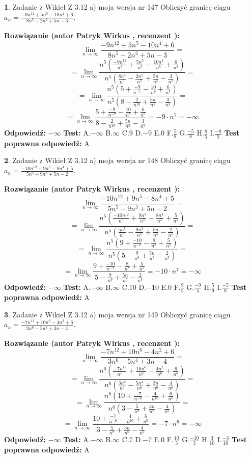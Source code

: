 \documentclass[12pt, a4paper]{article}
\theoremstyle{definition} %
\newtheorem{zad}{}
\newcommand{\zadStart}[1]{\begin{zad}#1\newline}
\newcommand{\zadStop}{\end{zad}}
\newcommand{\rozwStart}[2]{\noindent \textbf{Rozwiązanie (autor #1 , recenzent #2): }\newline}
\newcommand{\rozwStop}{\newline}
\newcommand{\odpStart}{\noindent \textbf{Odpowiedź:}\newline}
\newcommand{\odpStop}{\newline}
\newcommand{\testStart}{\noindent \textbf{Test:}\newline}
\newcommand{\testStop}{\newline}
\newcommand{\kluczStart}{\noindent \textbf{Test poprawna odpowiedź:}\newline}
\newcommand{\kluczStop}{\newline}
\begin{document}
\zadStart{Zadanie z Wikieł Z 3.12 a) moja wersja nr 147}
Obliczyć granicę ciągu $a_{n}=\frac{-9n^{12}+5n^{5}-10n^{4}+6}{8n^{5}-2n^{2}+5n-3}$.
\zadStop
\rozwStart{Patryk Wirkus}{}
$$\lim\limits_{n\to\infty}\frac{-9n^{12}+5n^{5}-10n^{4}+6}{8n^{5}-2n^{2}+5n-3}=$$
$$=\lim\limits_{n\to\infty}\frac{n^{5}\left(\frac{-9n^{12}}{n^{5}}+\frac{5n^{5}}{n^{5}}-\frac{10n^{4}}{n^{5}}+\frac{6}{n^{5}}\right)}{n^{5}\left(\frac{8n^{5}}{n^{5}}-\frac{2n^{2}}{n^{5}}+\frac{5n}{n^{5}}-\frac{3}{n^{5}}\right)}=$$
$$=\lim\limits_{n\to\infty}\frac{n^{5}\left(5+\frac{-9}{n^{-7}}-\frac{10}{n^{8}}+\frac{6}{n^{5}}\right)}
{n^{5}\left(8-\frac{2}{n^{10}}+\frac{5n}{n^{5}}-\frac{3}{n^{5}}\right)}=$$
$$=\lim\limits_{n\to\infty}\frac{5+\frac{-9}{n^{-7}}-\frac{10}{n^{8}}+\frac{6}{n^{5}}}{8-\frac{2}{n^{10}}+\frac{5n}{n^{5}}-\frac{3}{n^{5}}}=-9\cdot n^{7} = -\infty$$
\rozwStop
\odpStart
$-\infty$
\odpStop
\testStart
A.$-\infty$
B.$\infty$
C.$9$
D.$-9$
E.$0$
F.$\frac{5}{8}$
G.$\frac{-5}{8}$
H.$\frac{8}{5}$
I.$\frac{-8}{5}$
\testStop
\kluczStart
A
\kluczStop



\zadStart{Zadanie z Wikieł Z 3.12 a) moja wersja nr 148}
Obliczyć granicę ciągu $a_{n}=\frac{-10n^{12}+9n^{5}-8n^{4}+5}{5n^{5}-9n^{3}+5n-2}$.
\zadStop
\rozwStart{Patryk Wirkus}{}
$$\lim\limits_{n\to\infty}\frac{-10n^{12}+9n^{5}-8n^{4}+5}{5n^{5}-9n^{3}+5n-2}=$$
$$=\lim\limits_{n\to\infty}\frac{n^{5}\left(\frac{-10n^{12}}{n^{5}}+\frac{9n^{5}}{n^{5}}-\frac{8n^{4}}{n^{5}}+\frac{5}{n^{5}}\right)}{n^{5}\left(\frac{5n^{5}}{n^{5}}-\frac{9n^{3}}{n^{5}}+\frac{5n}{n^{5}}-\frac{2}{n^{5}}\right)}=$$
$$=\lim\limits_{n\to\infty}\frac{n^{5}\left(9+\frac{-10}{n^{-7}}-\frac{8}{n^{8}}+\frac{5}{n^{5}}\right)}
{n^{5}\left(5-\frac{9}{n^{9}}+\frac{5n}{n^{5}}-\frac{2}{n^{5}}\right)}=$$
$$=\lim\limits_{n\to\infty}\frac{9+\frac{-10}{n^{-7}}-\frac{8}{n^{8}}+\frac{5}{n^{5}}}{5-\frac{9}{n^{9}}+\frac{5n}{n^{5}}-\frac{2}{n^{5}}}=-10\cdot n^{7} = -\infty$$
\rozwStop
\odpStart
$-\infty$
\odpStop
\testStart
A.$-\infty$
B.$\infty$
C.$10$
D.$-10$
E.$0$
F.$\frac{9}{5}$
G.$\frac{-9}{5}$
H.$\frac{5}{9}$
I.$\frac{-5}{9}$
\testStop
\kluczStart
A
\kluczStop



\zadStart{Zadanie z Wikieł Z 3.12 a) moja wersja nr 149}
Obliczyć granicę ciągu $a_{n}=\frac{-7n^{12}+10n^{6}-4n^{2}+6}{3n^{6}-5n^{4}+3n-4}$.
\zadStop
\rozwStart{Patryk Wirkus}{}
$$\lim\limits_{n\to\infty}\frac{-7n^{12}+10n^{6}-4n^{2}+6}{3n^{6}-5n^{4}+3n-4}=$$
$$=\lim\limits_{n\to\infty}\frac{n^{6}\left(\frac{-7n^{12}}{n^{6}}+\frac{10n^{6}}{n^{6}}-\frac{4n^{2}}{n^{6}}+\frac{6}{n^{6}}\right)}{n^{6}\left(\frac{3n^{6}}{n^{6}}-\frac{5n^{4}}{n^{6}}+\frac{3n}{n^{6}}-\frac{4}{n^{6}}\right)}=$$
$$=\lim\limits_{n\to\infty}\frac{n^{6}\left(10+\frac{-7}{n^{-6}}-\frac{4}{n^{10}}+\frac{6}{n^{6}}\right)}
{n^{6}\left(3-\frac{5}{n^{8}}+\frac{3n}{n^{6}}-\frac{4}{n^{6}}\right)}=$$
$$=\lim\limits_{n\to\infty}\frac{10+\frac{-7}{n^{-6}}-\frac{4}{n^{10}}+\frac{6}{n^{6}}}{3-\frac{5}{n^{8}}+\frac{3n}{n^{6}}-\frac{4}{n^{6}}}=-7\cdot n^{6} = -\infty$$
\rozwStop
\odpStart
$-\infty$
\odpStop
\testStart
A.$-\infty$
B.$\infty$
C.$7$
D.$-7$
E.$0$
F.$\frac{10}{3}$
G.$\frac{-10}{3}$
H.$\frac{3}{10}$
I.$\frac{-3}{10}$
\testStop
\kluczStart
A
\kluczStop
\end{document}
